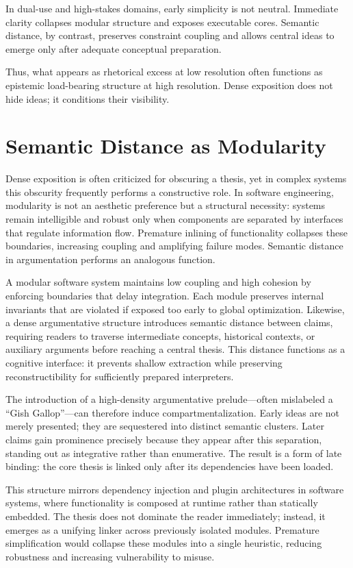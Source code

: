 In dual-use and high-stakes domains, early simplicity is not neutral. Immediate clarity collapses modular structure and exposes executable cores. Semantic distance, by contrast, preserves constraint coupling and allows central ideas to emerge only after adequate conceptual preparation.

Thus, what appears as rhetorical excess at low resolution often functions as epistemic load-bearing structure at high resolution. Dense exposition does not hide ideas; it conditions their visibility.

\section{Semantic Distance as Modularity}

Dense exposition is often criticized for obscuring a thesis, yet in complex systems this obscurity frequently performs a constructive role. In software engineering, modularity is not an aesthetic preference but a structural necessity: systems remain intelligible and robust only when components are separated by interfaces that regulate information flow. Premature inlining of functionality collapses these boundaries, increasing coupling and amplifying failure modes. Semantic distance in argumentation performs an analogous function.

A modular software system maintains low coupling and high cohesion by enforcing boundaries that delay integration. Each module preserves internal invariants that are violated if exposed too early to global optimization. Likewise, a dense argumentative structure introduces semantic distance between claims, requiring readers to traverse intermediate concepts, historical contexts, or auxiliary arguments before reaching a central thesis. This distance functions as a cognitive interface: it prevents shallow extraction while preserving reconstructibility for sufficiently prepared interpreters.

The introduction of a high-density argumentative prelude—often mislabeled a ``Gish Gallop''—can therefore induce compartmentalization. Early ideas are not merely presented; they are sequestered into distinct semantic clusters. Later claims gain prominence precisely because they appear after this separation, standing out as integrative rather than enumerative. The result is a form of late binding: the core thesis is linked only after its dependencies have been loaded.

This structure mirrors dependency injection and plugin architectures in software systems, where functionality is composed at runtime rather than statically embedded. The thesis does not dominate the reader immediately; instead, it emerges as a unifying linker across previously isolated modules. Premature simplification would collapse these modules into a single heuristic, reducing robustness and increasing vulnerability to misuse.

